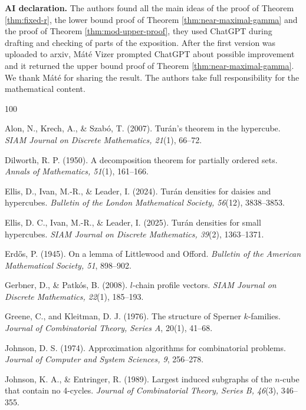 \documentclass[11pt]{article}
\theoremstyle{definition}
\theoremstyle{remark}
\begin{document}
\noindent \textbf{AI declaration.} The authors found all the main ideas of the proof of Theorem \ref{thm:fixed-r}, the lower bound proof of Theorem \ref{thm:near-maximal-gamma} and the proof of Theorem \ref{thm:mod-upper-proof}, they used ChatGPT during drafting and checking of parts of the exposition. After the first version was uploaded to arxiv, M\'at\'e Vizer prompted ChatGPT about possible improvement and it returned the upper bound proof of Theorem \ref{thm:near-maximal-gamma}. We thank M\'at\'e for sharing the result. The authors  take full responsibility for the mathematical content.

\begin{thebibliography}{100}

Alon, N., Krech, A., \& Szab\'o, T. (2007).
Tur\'an's theorem in the hypercube.
\emph{SIAM Journal on Discrete Mathematics, 21}(1), 66--72.

Dilworth, R. P. (1950).
A decomposition theorem for partially ordered sets.
\emph{Annals of Mathematics, 51}(1), 161--166.

Ellis, D., Ivan, M.-R., \& Leader, I. (2024).
Tur\'an densities for daisies and hypercubes.
\emph{Bulletin of the London Mathematical Society, 56}(12), 3838--3853.

Ellis, D. C., Ivan, M.-R., \& Leader, I. (2025).
Tur\'an densities for small hypercubes.
\emph{SIAM Journal on Discrete Mathematics, 39}(2), 1363--1371.

Erd\H{o}s, P. (1945).
On a lemma of Littlewood and Offord.
\emph{Bulletin of the American Mathematical Society, 51}, 898--902.

Gerbner, D., \& Patk\'os, B. (2008).
$l$-chain profile vectors.
\emph{SIAM Journal on Discrete Mathematics, 22}(1), 185--193.


Greene, C., and Kleitman, D. J. (1976).
The structure of Sperner \(k\)-families.
\emph{Journal of Combinatorial Theory, Series A}, 20(1), 41--68.


Johnson, D. S. (1974).
Approximation algorithms for combinatorial problems.
\emph{Journal of Computer and System Sciences, 9}, 256--278.

Johnson, K. A., \& Entringer, R. (1989).
Largest induced subgraphs of the $n$-cube that contain no 4-cycles.
\emph{Journal of Combinatorial Theory, Series B, 46}(3), 346--355.


\end{thebibliography}
\end{document}
